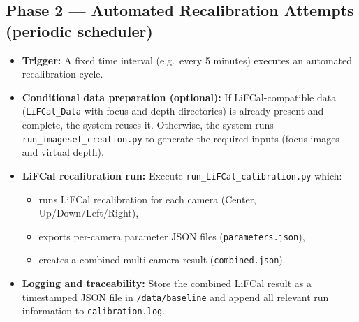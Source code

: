 \documentclass[12pt]{scrartcl}
\begin{document}
\subsection*{Phase 2 — Automated Recalibration Attempts (periodic scheduler)}
\begin{itemize}
  \item \textbf{Trigger:}
  A fixed time interval (e.g.\ every 5 minutes) executes an automated recalibration cycle.

  \item \textbf{Conditional data preparation (optional):}
  If LiFCal-compatible data (\texttt{LiFCal\_Data} with focus and depth directories) is already present and complete,
  the system reuses it. Otherwise, the system runs \texttt{run\_imageset\_creation.py} to generate the required inputs
  (focus images and virtual depth).

  \item \textbf{LiFCal recalibration run:}
  Execute \texttt{run\_LiFCal\_calibration.py} which:
  \begin{itemize}
    \item runs LiFCal recalibration for each camera (Center, Up/Down/Left/Right),
    \item exports per-camera parameter JSON files (\texttt{parameters.json}),
    \item creates a combined multi-camera result (\texttt{combined.json}).
  \end{itemize}

  \item \textbf{Logging and traceability:}
  Store the combined LiFCal result as a timestamped JSON file in \texttt{/data/baseline}
  and append all relevant run information to \texttt{calibration.log}.
\end{itemize}
\end{document}
